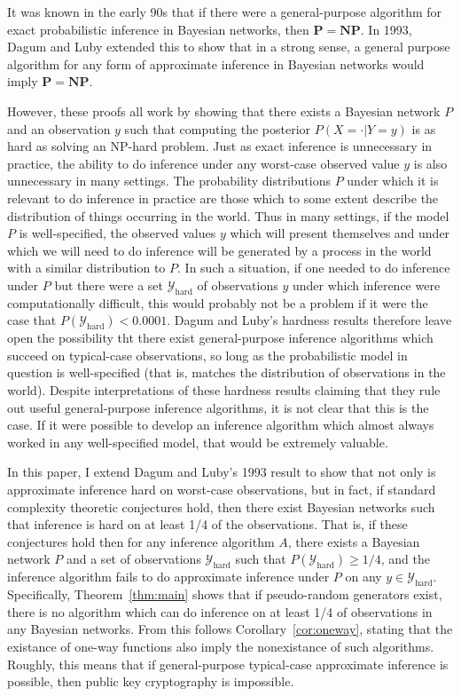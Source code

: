 \documentclass{article}
\renewcommand{\P}{\mathbf{P}}
\newcommand{\NP}{\mathbf{NP}}
\theoremstyle{definition}
\theoremstyle{remark}
\begin{document}
It was known in the early 90s \cite{cooper1990} that if there were a general-purpose algorithm for exact probabilistic inference in Bayesian networks, then $\P = \NP$.
In 1993, Dagum and Luby \cite{dagum1993} extended this to show that in a strong sense, a general purpose algorithm for any form of approximate inference in Bayesian networks would imply $\P = \NP$.

However, these proofs all work by showing that there exists a Bayesian network $P$ and an observation $y$ such that computing the posterior $P(X = \cdot | Y = y)$ is as hard as solving an NP-hard problem.
Just as exact inference is unnecessary in practice, the ability to do inference under any worst-case observed value $y$ is also unnecessary in many settings.
The probability distributions $P$ under which it is relevant to do inference in practice are those which to some extent describe the distribution of things occurring in the world.
Thus in many settings, if the model $P$ is well-specified, the observed values $y$ which will present themselves and under which we will need to do inference will be generated by a process in the world with a similar distribution to $P$.
In such a situation, if one needed to do inference under $P$ but there were a set $\mathcal{Y}_\text{hard}$ of observations $y$ under which inference were computationally difficult, this would probably not be a problem if it were the case that $P(\mathcal{Y}_\text{hard}) < 0.0001$.
Dagum and Luby's hardness results therefore leave open the possibility tht there exist general-purpose inference algorithms which succeed on typical-case observations, so long as the probabilistic model in question is well-specified (that is, matches the distribution of observations in the world).
Despite interpretations of these hardness results claiming that they rule out useful general-purpose inference algorithms, it is not clear that this is the case.
If it were possible to develop an inference algorithm which almost always worked in any well-specified model, that would be extremely valuable.

In this paper, I extend Dagum and Luby's 1993 result \cite{dagum1993} to show that not only is approximate inference hard on worst-case observations, but in fact, if standard complexity theoretic conjectures hold, then there exist Bayesian networks such that inference is hard on at least 1/4 of the observations.
That is, if these conjectures hold then for any inference algorithm $A$, there exists a Bayesian network $P$ and a set of observations $\mathcal{Y}_\text{hard}$ such that $P(\mathcal{Y}_\text{hard}) \geq 1/4$, and the inference algorithm fails to do approximate inference under $P$ on any $y \in \mathcal{Y}_\text{hard}$.
Specifically, Theorem~\ref{thm:main} shows that if pseudo-random generators exist, there is no algorithm which can do inference on at least 1/4 of observations in any Bayesian networks.
From this follows Corollary~\ref{cor:oneway}, stating that the existance of one-way functions also imply the nonexistance of such algorithms.
Roughly, this means that if general-purpose typical-case approximate inference is possible, then public key cryptography is impossible.
\end{document}
